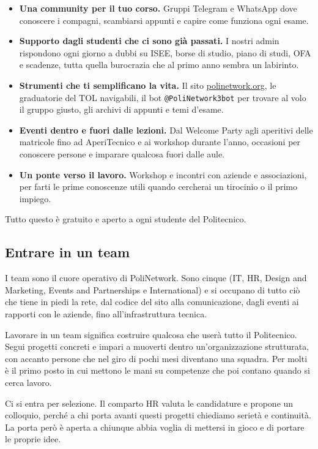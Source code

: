 \documentclass[legal]{polinetwork}
\begin{document}
\begin{itemize}
  \item \textbf{Una community per il tuo corso.} Gruppi Telegram e WhatsApp dove conoscere i compagni, scambiarsi appunti e capire come funziona ogni esame.
  \item \textbf{Supporto dagli studenti che ci sono già passati.} I nostri admin rispondono ogni giorno a dubbi su ISEE, borse di studio, piano di studi, OFA e scadenze, tutta quella burocrazia che al primo anno sembra un labirinto.
  \item \textbf{Strumenti che ti semplificano la vita.} Il sito \href{https://polinetwork.org}{polinetwork.org}, le graduatorie del TOL navigabili, il bot \texttt{@PoliNetwork3bot} per trovare al volo il gruppo giusto, gli archivi di appunti e temi d'esame.
  \item \textbf{Eventi dentro e fuori dalle lezioni.} Dal Welcome Party agli aperitivi delle matricole fino ad AperiTecnico e ai workshop durante l'anno, occasioni per conoscere persone e imparare qualcosa fuori dalle aule.
  \item \textbf{Un ponte verso il lavoro.} Workshop e incontri con aziende e associazioni, per farti le prime conoscenze utili quando cercherai un tirocinio o il primo impiego.
\end{itemize}


Tutto questo è gratuito e aperto a ogni studente del Politecnico.

\subsection{Entrare in un team}


I team sono il cuore operativo di PoliNetwork. Sono cinque (IT, HR, Design and Marketing, Events and Partnerships e International) e si occupano di tutto ciò che tiene in piedi la rete, dal codice del sito alla comunicazione, dagli eventi ai rapporti con le aziende, fino all'infrastruttura tecnica.

Lavorare in un team significa costruire qualcosa che userà tutto il Politecnico. Segui progetti concreti e impari a muoverti dentro un'organizzazione strutturata, con accanto persone che nel giro di pochi mesi diventano una squadra. Per molti è il primo posto in cui mettono le mani su competenze che poi contano quando si cerca lavoro.

Ci si entra per selezione. Il comparto HR valuta le candidature e propone un colloquio, perché a chi porta avanti questi progetti chiediamo serietà e continuità. La porta però è aperta a chiunque abbia voglia di mettersi in gioco e di portare le proprie idee.
\end{document}
